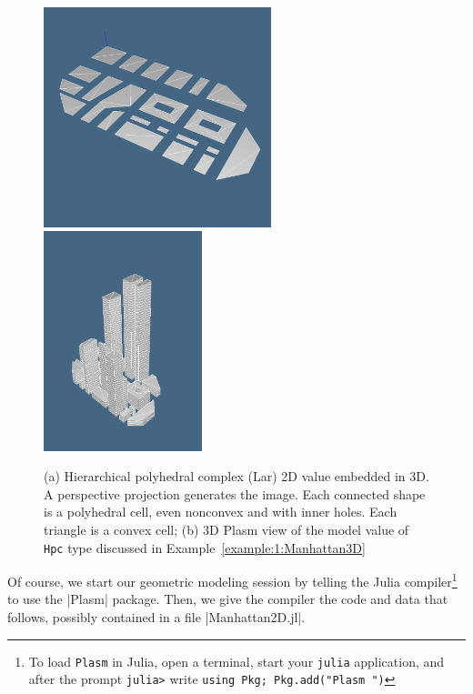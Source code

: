 \begin{script}
\begin{coding}
\begin{figure}
\centering
   \includegraphics[width=0.59\textwidth]{chapter-01/figs/manhattan2d.pdf}%
   \includegraphics[width=0.41\textwidth]{chapter-01/figs/manhattan3d-1.pdf}

\caption{(a) Hierarchical polyhedral complex (Lar) 2D value embedded in 3D. A perspective projection generates the image. Each connected shape is a polyhedral cell, even nonconvex and with inner holes. Each triangle is a convex cell; (b) 3D Plasm view of the model value of \texttt{Hpc} type discussed in Example~\ref{example:1:Manhattan3D}}
\label{fig:1:FP}
\end{figure}

Of course, we start our geometric modeling session by telling the Julia compiler\footnote{To load \texttt{Plasm} in Julia, open a terminal, start your \texttt{julia} application, and after the prompt \texttt{julia>} write \texttt{using Pkg; Pkg.add("Plasm ")}} to use the |Plasm| package. Then, we give the compiler the code and data that follows, possibly contained in a file |Manhattan2D.jl|.


\end{coding}
\end{script}
